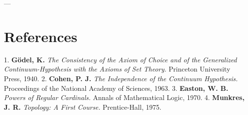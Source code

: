 \documentclass[11pt,twocolumn]{article}
\begin{document}
---

\section{References}
1. \textbf{Gödel, K.} \textit{The Consistency of the Axiom of Choice and of the Generalized Continuum-Hypothesis with the Axioms of Set Theory.} Princeton University Press, 1940.
2. \textbf{Cohen, P. J.} \textit{The Independence of the Continuum Hypothesis.} Proceedings of the National Academy of Sciences, 1963.
3. \textbf{Easton, W. B.} \textit{Powers of Regular Cardinals.} Annals of Mathematical Logic, 1970.
4. \textbf{Munkres, J. R.} \textit{Topology: A First Course.} Prentice-Hall, 1975.
\end{document}
